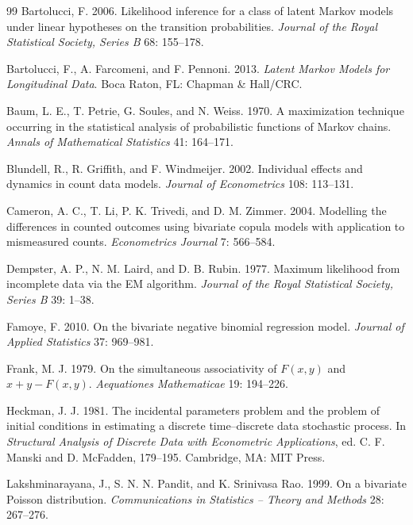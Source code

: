 \documentclass[11pt,a4paper]{article}
\begin{document}
\begin{thebibliography}{99}
Bartolucci, F. 2006. Likelihood inference for a class of latent Markov models under linear hypotheses on
the transition probabilities. \textit{Journal of the Royal Statistical Society, Series B} 68: 155--178.

Bartolucci, F., A. Farcomeni, and F. Pennoni. 2013. \textit{Latent Markov Models for Longitudinal Data}.
Boca Raton, FL: Chapman \& Hall/CRC.

Baum, L. E., T. Petrie, G. Soules, and N. Weiss. 1970. A maximization technique occurring in the
statistical analysis of probabilistic functions of Markov chains. \textit{Annals of Mathematical
Statistics} 41: 164--171.

Blundell, R., R. Griffith, and F. Windmeijer. 2002. Individual effects and dynamics in count data
models. \textit{Journal of Econometrics} 108: 113--131.

Cameron, A. C., T. Li, P. K. Trivedi, and D. M. Zimmer. 2004. Modelling the differences in counted
outcomes using bivariate copula models with application to mismeasured counts. \textit{Econometrics
Journal} 7: 566--584.

Dempster, A. P., N. M. Laird, and D. B. Rubin. 1977. Maximum likelihood from incomplete data via the EM
algorithm. \textit{Journal of the Royal Statistical Society, Series B} 39: 1--38.

Famoye, F. 2010. On the bivariate negative binomial regression model. \textit{Journal of Applied
Statistics} 37: 969--981.

Frank, M. J. 1979. On the simultaneous associativity of $F(x,y)$ and $x+y-F(x,y)$.
\textit{Aequationes Mathematicae} 19: 194--226.

Heckman, J. J. 1981. The incidental parameters problem and the problem of initial conditions in
estimating a discrete time--discrete data stochastic process. In \textit{Structural Analysis of
Discrete Data with Econometric Applications}, ed. C. F. Manski and D. McFadden, 179--195. Cambridge, MA:
MIT Press.

Lakshminarayana, J., S. N. N. Pandit, and K. Srinivasa Rao. 1999. On a bivariate Poisson distribution.
\textit{Communications in Statistics -- Theory and Methods} 28: 267--276.


\end{thebibliography}
\end{document}
